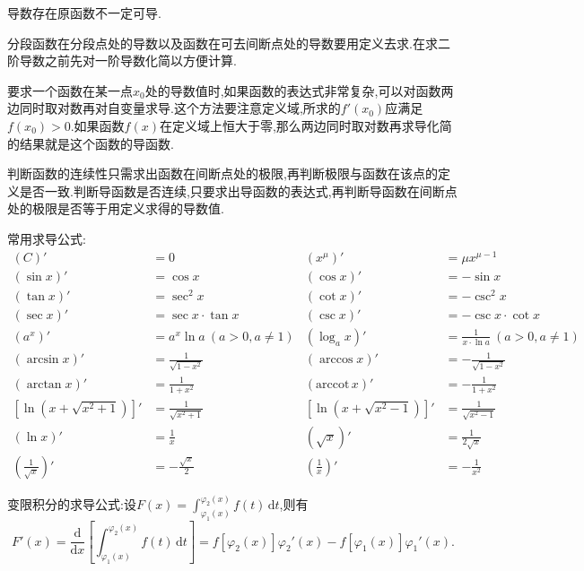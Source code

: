 导数存在原函数不一定可导.

分段函数在分段点处的导数以及函数在可去间断点处的导数要用定义去求.在求二阶导数之前先对一阶导数化简以方便计算.

要求一个函数在某一点$x_0$处的导数值时,如果函数的表达式非常复杂,可以对函数两边同时取对数再对自变量求导.这个方法要注意定义域,所求的$f'(x_0)$应满足$f(x_0)>0$.如果函数$f(x)$在定义域上恒大于零,那么两边同时取对数再求导化简的结果就是这个函数的导函数.

\begin{theorem}[导函数的连续性]
    判断函数的连续性只需求出函数在间断点处的极限,再判断极限与函数在该点的定义是否一致.判断导函数是否连续,只要求出导函数的表达式,再判断导函数在间断点处的极限是否等于用定义求得的导数值.
\end{theorem}

常用求导公式:
    \begin{align*}
        \left( C\right)' &=0 &
        \left( x^{\mu}\right)' &=\mu x^{\mu-1}\\
        \left( \sin x\right)' &=\cos x &
        \left( \cos x\right)' &=-\sin x\\
        \left( \tan x\right)' &=\sec^2 x &
        \left( \cot x\right)' &=-\csc^2 x\\
        \left( \sec x\right)' &=\sec x\cdot\tan x &
        \left( \csc x\right)' &=-\csc x\cdot\cot x\\
        \left( a^x\right)' &=a^x\ln a\ (a>0,a\neq1) &
        \left( \log_{a}x\right)' &=\frac{1}{x\cdot\ln a}\ (a>0,a\neq1)\\
        \left( \arcsin x\right)' &=\frac{1}{\sqrt{1-x^2}} &
        \left( \arccos x\right)' &=-\frac{1}{\sqrt{1-x^2}}\\
        \left( \arctan x\right)' &=\frac{1}{1+x^2} &
        \left( \mathrm{arccot}\, x\right)' &=-\frac{1}{1+x^2}\\
        \left[\ln (x+\sqrt{x^2+1})\right] '&=\frac{1}{\sqrt{x^2+1}} &
        \left[\ln (x+\sqrt{x^2-1})\right] '&=\frac{1}{\sqrt{x^2-1}}\\
        \left(\ln x\right) '&=\frac{1}{x} &
        \left(\sqrt{x}\right) '&=\frac{1}{2\sqrt{x}}\\
        \left(\frac{1}{\sqrt{x}}\right)'&=-\frac{\sqrt{x}}{2} &
        \left( \frac{1}{x} \right)'&=-\frac{1}{x^2}
    \end{align*}

变限积分的求导公式:设$\displaystyle F(x)=\int_{\varphi _1(x)}^{\varphi _2(x)} f(t) \,\mathrm{d} t $,则有
    \begin{equation*}
        F'(x)=\frac{\mathrm{d}}{\mathrm{d}x}\left[\int_{\varphi _1(x)}^{\varphi _2(x)} f(t) \,\mathrm{d}t\right] =f[\varphi _2(x)]\varphi _2'(x)-f[\varphi _1(x)]\varphi _1'(x).
    \end{equation*}

